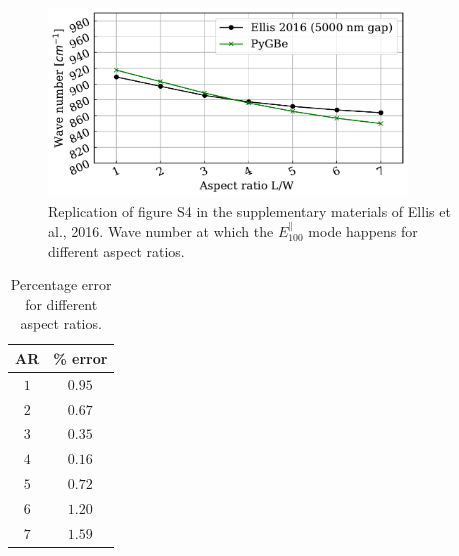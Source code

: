 \begin{figure}
    \centering
    \includegraphics[width=0.85\textwidth]{AR_rep_FS4_Ellis2016.pdf} 
    \caption{Replication of figure S4 in the supplementary materials of Ellis et al., 2016. Wave
    number at which the $E^{\parallel}_{100}$ mode happens for different aspect ratios.}
    \label{fig:rep_FS4_ellis}
 \end{figure}
 
 \begin{table}
    \centering
    \caption{Percentage error for different aspect ratios.} 
    \label{tab:err_AR}
    \begin{tabular}{c c}
    \hline%
    AR & \% error \\
    \hline%
     $1$ & $0.95$ \\
     $2$ & $0.67$ \\
     $3$ & $0.35$ \\
     $4$ & $0.16$ \\
     $5$ & $0.72$ \\
     $6$ & $1.20$ \\
     $7$ & $1.59$ \\
    \hline%
    \end{tabular}
\end{table}


